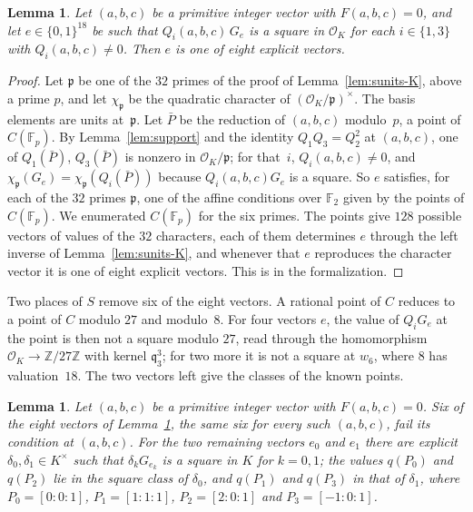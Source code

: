 \documentclass[11pt]{amsart}
\newtheorem{lemma}[theorem]{Lemma}
\theoremstyle{definition}
\numberwithin{equation}{section}
\newcommand{\Z}{\mathbb{Z}}
\newcommand{\F}{\mathbb{F}}
\newcommand{\OK}{\mathcal{O}_K}
\newcommand{\lean}[1]{\ignorespaces}
\begin{document}
\begin{lemma}\label{lem:sieve}\lean{FurioLombardo.M1.sieve_good}
Let $(a,b,c)$ be a primitive integer vector with $F(a,b,c)=0$, and let $e\in\{0,1\}^{18}$ be such that $Q_i(a,b,c)\,G_e$ is a square in $\OK$ for each $i\in\{1,3\}$ with $Q_i(a,b,c)\neq0$. Then $e$ is one of eight explicit vectors.
\end{lemma}

\begin{proof}
Let $\mathfrak p$ be one of the $32$ primes of the proof of Lemma~\ref{lem:sunits-K}, above a prime $p$, and let $\chi_{\mathfrak p}$ be the quadratic character of $(\OK/\mathfrak p)^\times$. The basis elements are units at~$\mathfrak p$. Let $\bar P$ be the reduction of $(a,b,c)$ modulo~$p$, a point of $C(\F_p)$. By Lemma~\ref{lem:support} and the identity $Q_1Q_3=Q_2^2$ at $(a,b,c)$, one of $Q_1(\bar P)$, $Q_3(\bar P)$ is nonzero in $\OK/\mathfrak p$; for that~$i$, $Q_i(a,b,c)\neq0$, and $\chi_{\mathfrak p}(G_e)=\chi_{\mathfrak p}(Q_i(\bar P))$ because $Q_i(a,b,c)G_e$ is a square. So $e$ satisfies, for each of the $32$ primes $\mathfrak p$, one of the affine conditions over $\F_2$ given by the points of $C(\F_p)$. We enumerated $C(\F_p)$ for the six primes. The points give $128$ possible vectors of values of the $32$ characters, each of them determines $e$ through the left inverse of Lemma~\ref{lem:sunits-K}, and whenever that $e$ reproduces the character vector it is one of eight explicit vectors. This is  in the formalization.
\end{proof}

Two places of $S$ remove six of the eight vectors. A rational point of $C$ reduces to a point of $C$ modulo $27$ and modulo~$8$. For four vectors $e$, the value of $Q_iG_e$ at the point is then not a square modulo $27$, read through the homomorphism $\OK\to\Z/27\Z$ with kernel $\mathfrak q_3^3$; for two more it is not a square at $w_6$, where $8$ has valuation~$18$. The two vectors left give the classes of the known points.

\begin{lemma}\label{lem:local-kills}\lean{FurioLombardo.M1.kill3, FurioLombardo.M1.kill2, FurioLombardo.M1.known_eq, FurioLombardo.M1.ck_known0, FurioLombardo.M1.ck_known1, FurioLombardo.M1.survOf, FurioLombardo.Discharge.M3a.Bruin.x0, FurioLombardo.Discharge.M3a.Bruin.x1, FurioLombardo.Discharge.M3a.Bruin.x2, FurioLombardo.Discharge.M3a.Bruin.x3}
Let $(a,b,c)$ be a primitive integer vector with $F(a,b,c)=0$. Six of the eight vectors of Lemma~\ref{lem:sieve}, the same six for every such $(a,b,c)$, fail its condition at $(a,b,c)$. For the two remaining vectors $e_0$ and $e_1$ there are explicit $\delta_0,\delta_1\in K^\times$ such that $\delta_kG_{e_k}$ is a square in $K$ for $k=0,1$; the values $q(P_0)$ and $q(P_2)$ lie in the square class of $\delta_0$, and $q(P_1)$ and $q(P_3)$ in that of $\delta_1$, where $P_0=[0:0:1]$, $P_1=[1:1:1]$, $P_2=[2:0:1]$ and $P_3=[-1:0:1]$.
\end{lemma}
\end{document}
